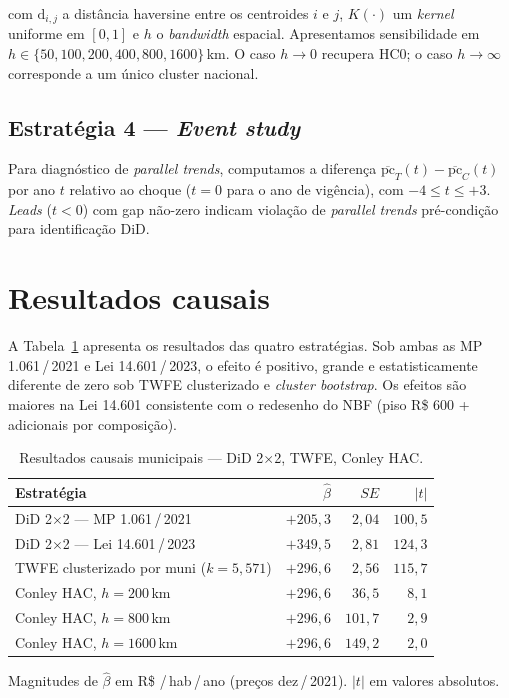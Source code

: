 \documentclass[12pt,a4paper,oneside]{article}
\newcommand{\rs}{R\$\,}
\begin{document}
\noindent
com $\text{d}_{i, j}$ a distância haversine entre os centroides $i$ e
$j$, $K(\cdot)$ um \textit{kernel} uniforme em $[0, 1]$ e $h$ o
\textit{bandwidth} espacial. Apresentamos sensibilidade em
$h \in \{50, 100, 200, 400, 800, 1600\}$\,km. O caso $h \to 0$
recupera HC0; o caso $h \to \infty$ corresponde a um único cluster
nacional.

\subsection{Estratégia 4 — \textit{Event study}}

Para diagnóstico de \textit{parallel trends}, computamos a diferença
$\overline{\text{pc}}_T(t) - \overline{\text{pc}}_C(t)$ por ano $t$
relativo ao choque ($t = 0$ para o ano de vigência), com $-4 \leq
t \leq +3$. \textit{Leads} ($t < 0$) com gap não-zero indicam
violação de \textit{parallel trends} \textemdash{} pré-condição para
identificação DiD.

\section{Resultados causais}\label{sec:resultados-causal}

A Tabela~\ref{tab:causal} apresenta os resultados das quatro
estratégias. Sob ambas as MP 1.061\,/\,2021 e Lei 14.601\,/\,2023, o
efeito é positivo, grande e estatisticamente diferente de zero sob
TWFE clusterizado e \textit{cluster bootstrap}. Os efeitos são
maiores na Lei 14.601 \textemdash{} consistente com o redesenho do
NBF (piso \rs\,600 + adicionais por composição).

\begin{table}[htbp]
\centering
\caption{Resultados causais municipais — DiD 2$\times$2, TWFE, Conley HAC.}
\label{tab:causal}
\begin{tabular}{lrrr}
\toprule
\textbf{Estratégia} & $\hat{\beta}$ & $SE$ & $|t|$ \\
\midrule
DiD 2$\times$2 — MP 1.061\,/\,2021      & $+205{,}3$ & $2{,}04$ & $100{,}5$ \\
DiD 2$\times$2 — Lei 14.601\,/\,2023     & $+349{,}5$ & $2{,}81$ & $124{,}3$ \\
TWFE clusterizado por muni ($k = 5{,}571$) & $+296{,}6$ & $2{,}56$ & $115{,}7$ \\
Conley HAC, $h = 200$\,km                  & $+296{,}6$ & $36{,}5$ & $8{,}1$ \\
Conley HAC, $h = 800$\,km                  & $+296{,}6$ & $101{,}7$ & $2{,}9$ \\
Conley HAC, $h = 1600$\,km                 & $+296{,}6$ & $149{,}2$ & $2{,}0$ \\
\bottomrule
\end{tabular}
\par\medskip\noindent
{\footnotesize Magnitudes de $\hat{\beta}$ em \rs\,/\,hab\,/\,ano (preços
dez\,/\,2021). $|t|$ em valores absolutos.}
\end{table}
\end{document}
